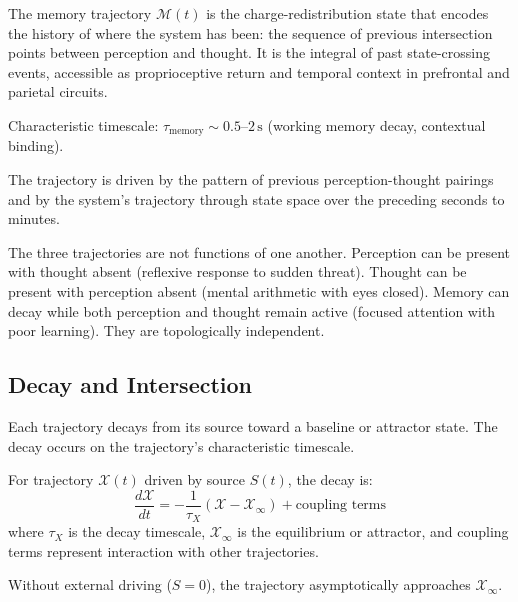\begin{definition}
\label{def:memory-traj}
The memory trajectory $\mathcal{M}(t)$ is the charge-redistribution state that encodes the history of where the system has been: the sequence of previous intersection points between perception and thought. It is the integral of past state-crossing events, accessible as proprioceptive return and temporal context in prefrontal and parietal circuits.

Characteristic timescale: $\tau_{\text{memory}} \sim 0.5\text{--}2\,\text{s}$ (working memory decay, contextual binding).

The trajectory is driven by the pattern of previous perception-thought pairings and by the system's trajectory through state space over the preceding seconds to minutes.
\end{definition}

\begin{remark}
The three trajectories are not functions of one another. Perception can be present with thought absent (reflexive response to sudden threat). Thought can be present with perception absent (mental arithmetic with eyes closed). Memory can decay while both perception and thought remain active (focused attention with poor learning). They are topologically independent.
\end{remark}

\subsection{Decay and Intersection}

Each trajectory decays from its source toward a baseline or attractor state. The decay occurs on the trajectory's characteristic timescale.

\begin{definition}
For trajectory $\mathcal{X}(t)$ driven by source $S(t)$, the decay is:
\begin{equation}
\frac{d\mathcal{X}}{dt} = -\frac{1}{\tau_X}(\mathcal{X} - \mathcal{X}_{\infty}) + \text{coupling terms}
\end{equation}
where $\tau_X$ is the decay timescale, $\mathcal{X}_{\infty}$ is the equilibrium or attractor, and coupling terms represent interaction with other trajectories.

Without external driving ($S = 0$), the trajectory asymptotically approaches $\mathcal{X}_{\infty}$.
\end{definition}

